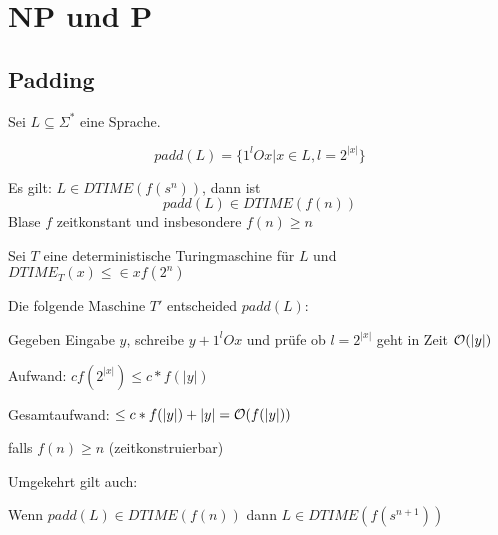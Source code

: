 




\chapter{NP und P} %
\label{cha:np_und_p}
        

\section{Padding}

\begin{definition}
    Sei $L \subseteq \Sigma^\ast$ eine Sprache.


    $$ padd(L) = \{1^l O x | x \in L, l = 2^{|x|} \} $$
\end{definition}


\begin{satz}
    
    Es gilt: 
    $ L \in DTIME(f(s^n)) $, dann ist
    $$ padd(L) \in DTIME(f(n)) $$
    Blase $f$ zeitkonstant und insbesondere $f(n) \geq n$

\end{satz}

\begin{beweis}
    
    Sei $T$ eine deterministische Turingmaschine für $L$ und
    $DTIME_T(x) \leq \in x f(2^n)$

    Die folgende Maschine $T'$ entscheided $padd(L)$:

    Gegeben Eingabe $y$, schreibe $y + 1^l O x$ und prüfe ob $l = 2^{|x|}$
    geht in Zeit $\mathcal{O}(|y|)$

    Aufwand: 
    $c f(2^{|x|}) \leq c * f(|y|)$

    Gesamtaufwand:
    $\leq c * f(|y|) + |y|
    = \mathcal{O}(f(|y|))$

    falls $f(n) \geq n$ (zeitkonstruierbar)
\end{beweis}




\begin{satz}
    Umgekehrt gilt auch:

    Wenn $padd(L) \in DTIME(f(n))$
    dann $L \in DTIME(f(s^{n+1}))$
\end{satz}

